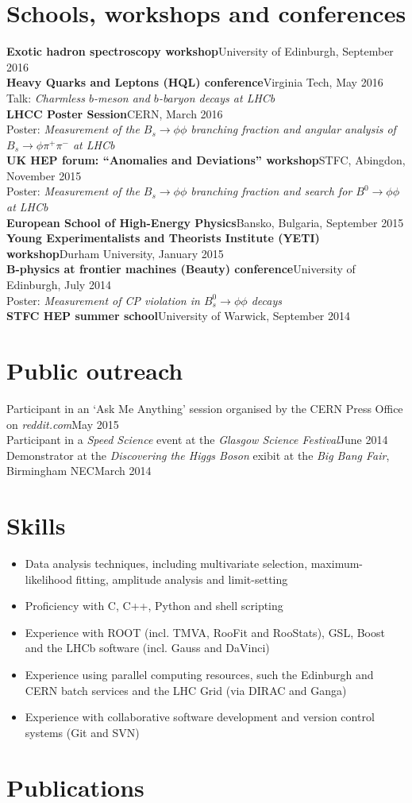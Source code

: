\documentclass{simplecv}
\newcommand\dateditem[2]{#1\hfill#2\\}
\newcommand\topictitle[3]{\dateditem{{\textbf{#1}}}{#3}#2}
\begin{document}
	\section{Schools, workshops and conferences}
	\topictitle{Exotic hadron spectroscopy workshop}{}{University of Edinburgh, September 2016}[0.5em]
	\topictitle{Heavy Quarks and Leptons (HQL) conference}{Talk: \textit{Charmless $b$-meson and $b$-baryon decays at LHCb}}{Virginia Tech, May 2016}\\[0.5em]
	\topictitle{LHCC Poster Session}{Poster: \textit{Measurement of the $B_s \to \phi \phi$ branching fraction and angular analysis of $B_s \to \phi \pi^{+} \pi^{-}$ at LHCb}}{CERN, March 2016}\\[0.5em]
	\topictitle{UK HEP forum: ``Anomalies and Deviations'' workshop}{Poster: \textit{Measurement of the $B_s \to \phi \phi$ branching fraction and search for $B^0 \to \phi \phi$ at LHCb}}{STFC, Abingdon, November 2015}\\[0.5em]
	\topictitle{European School of High-Energy Physics}{}{Bansko, Bulgaria, September 2015}[0.5em]
	\topictitle{Young Experimentalists and Theorists Institute (YETI) workshop}{}{Durham University, January 2015}[0.5em]
	\topictitle{B-physics at frontier machines (Beauty) conference}{Poster: \textit{Measurement of CP violation in $B^0_s \to \phi\phi$ decays}}{University of Edinburgh, July 2014}\\[0.5em]
	\topictitle{STFC HEP summer school}{}{University of Warwick, September 2014}[0.5em]
	\section{Public outreach}
	\dateditem{Participant in an `Ask Me Anything' session organised by the CERN Press Office on \textit{reddit.com}}{May 2015}
	\dateditem{Participant in a \textit{Speed Science} event at the \textit{Glasgow Science Festival}}{June 2014}
	\dateditem{Demonstrator at the \textit{Discovering the Higgs Boson} exibit at the \textit{Big Bang Fair}, Birmingham NEC}{March 2014}
	\section{Skills}
	\begin{itemize}
		\itemsep-0.3em
		\item Data analysis techniques, including multivariate selection, maximum-likelihood fitting, amplitude analysis and limit-setting
		\item Proficiency with C, C++, Python and shell scripting
		\item Experience with ROOT (incl. TMVA, RooFit and RooStats), GSL, Boost and the LHCb software (incl. Gauss and DaVinci)
		\item Experience using parallel computing resources, such the Edinburgh and CERN batch services and the LHC Grid (via DIRAC and Ganga)
		\item Experience with collaborative software development and version control systems (Git and SVN)
	\end{itemize}
	\section{Publications}
\end{document}
